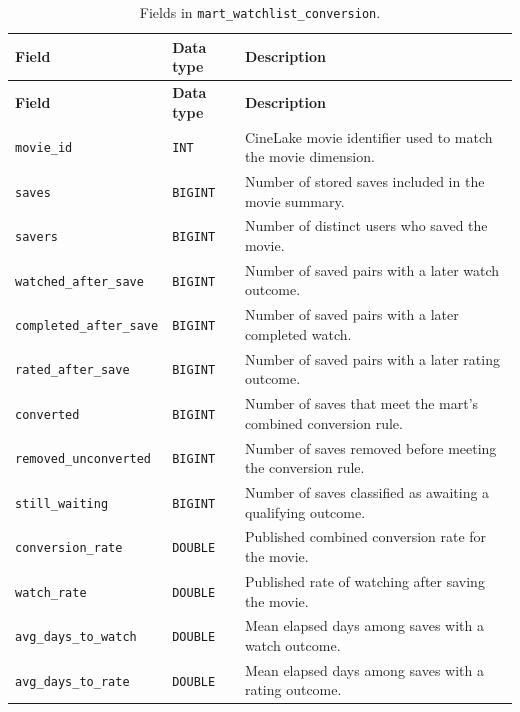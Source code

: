 \documentclass[a4paper,12pt]{article}
\newcommand{\dbsep}{\_\allowbreak}
\begin{document}
\begingroup
\small
\setlength{\tabcolsep}{4pt}
\renewcommand{\arraystretch}{1.1}
\begin{longtable}{@{}>{\raggedright\arraybackslash}p{}
                    >{\raggedright\arraybackslash}p{}
                    >{\raggedright\arraybackslash}p{}@{}}
\caption{Fields in \texttt{mart\dbsep watchlist\dbsep conversion}.}\\
\toprule
\textbf{Field} & \textbf{Data type} & \textbf{Description}\\
\midrule
\endfirsthead
\toprule
\textbf{Field} & \textbf{Data type} & \textbf{Description}\\
\midrule
\endhead
\bottomrule
\endfoot
\texttt{movie\dbsep id} & \texttt{INT} & CineLake movie identifier used to match the movie dimension.\\
\texttt{saves} & \texttt{BIGINT} & Number of stored saves included in the movie summary.\\
\texttt{savers} & \texttt{BIGINT} & Number of distinct users who saved the movie.\\
\texttt{watched\dbsep after\dbsep save} & \texttt{BIGINT} & Number of saved pairs with a later watch outcome.\\
\texttt{completed\dbsep after\dbsep save} & \texttt{BIGINT} & Number of saved pairs with a later completed watch.\\
\texttt{rated\dbsep after\dbsep save} & \texttt{BIGINT} & Number of saved pairs with a later rating outcome.\\
\texttt{converted} & \texttt{BIGINT} & Number of saves that meet the mart's combined conversion rule.\\
\texttt{removed\dbsep unconverted} & \texttt{BIGINT} & Number of saves removed before meeting the conversion rule.\\
\texttt{still\dbsep waiting} & \texttt{BIGINT} & Number of saves classified as awaiting a qualifying outcome.\\
\texttt{conversion\dbsep rate} & \texttt{DOUBLE} & Published combined conversion rate for the movie.\\
\texttt{watch\dbsep rate} & \texttt{DOUBLE} & Published rate of watching after saving the movie.\\
\texttt{avg\dbsep days\dbsep to\dbsep watch} & \texttt{DOUBLE} & Mean elapsed days among saves with a watch outcome.\\
\texttt{avg\dbsep days\dbsep to\dbsep rate} & \texttt{DOUBLE} & Mean elapsed days among saves with a rating outcome.\\

\end{longtable}
\end{document}
